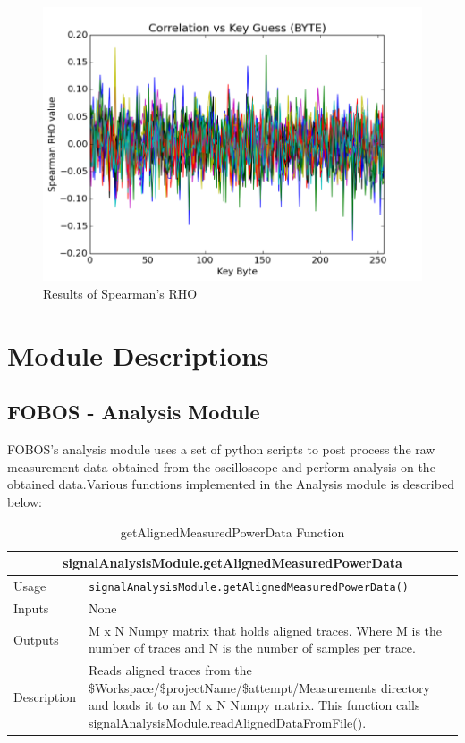 \documentclass{llncs}
\numberwithin{algorithm}{chapter}
\begin{document}
\begin{figure}[H]
\begin{center}
\includegraphics[scale=0.8]{figures/spearman-rho}
\caption{\label{fig:spcorrplt}{Results of Spearman's RHO}}
\end{center} 
\vspace{-3ex}
\end{figure}


\newpage
\section{Module Descriptions}

\subsection{FOBOS - Analysis Module}
FOBOS's analysis module uses a set of python scripts to post process the raw measurement data obtained from the oscilloscope and perform analysis on the obtained data.Various functions implemented in the Analysis module is described below:\newline

\begin{table}[H]
\caption{getAlignedMeasuredPowerData Function}
\begin{tabular}{ |p{2cm}||p{11cm}|  }
 \hline
 \multicolumn{2}{|c|}{\cellcolor{teal}\textbf{signalAnalysisModule.getAlignedMeasuredPowerData}} \\
 \hline
 Usage & \texttt{signalAnalysisModule.getAlignedMeasuredPowerData()}\\ \hline
 Inputs & None \\ \hline
 Outputs & M x N Numpy matrix that holds aligned traces. Where M is the number of traces and N is the number of samples per trace.\\ \hline
 Description & Reads aligned traces from the \$Workspace/\$projectName/\$attempt/Measurements directory and loads it to an M x N Numpy matrix.
This function calls signalAnalysisModule.readAlignedDataFromFile(). \\ \hline
\end{tabular}
\end{table}
\end{document}
